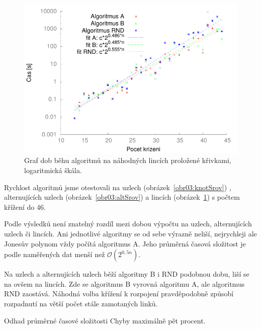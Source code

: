 \begin{figure}[p]\centering
\includegraphics{../img/linksFIT}
\caption{Graf dob běhu algoritmů na náhodných lincích proložené křivkami, logaritmická škála.}
\label{obr03:linkSrov}
\end{figure}

Rychlost algoritmů jsme otestovali na uzlech (obrázek~\ref{obr03:knotSrov}) , alternujících uzlech (obrázek~\ref{obr03:altSrov}) a lincích (obrázek~\ref{obr03:linkSrov}) s počtem křížení do 46. 

Podle výsledků není znatelný rozdíl mezi dobou výpočtu na uzlech, alternujících uzlech či lincích. Ani jednotlivé algoritmy se od sebe výrazně neliší, nejrychleji ale Jonesův polynom vždy počítá algoritmus A. Jeho průměrná časová složitost je podle naměřených dat menší než $\mathcal{O}(2^{0,5n})$. 

Na uzlech a alternujících uzlech běží algoritmy B i RND podobnou dobu, liší se na ovšem na lincích. Zde se algoritmus B vyrovná algoritmu A, ale algoritmus RND zaostává. Náhodná volba křížení k rozpojení pravděpodobně způsobí rozpadnutí na větší počet stále zamotaných linků.

Odhad průměrné časové složitosti
Chyby maximálně pět procent.

